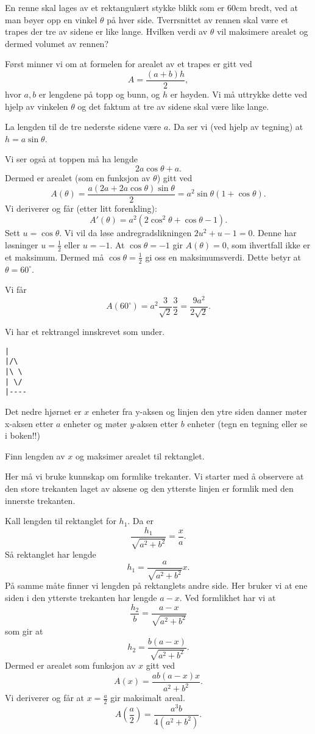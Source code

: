 \documentclass[11pt, norsk]{article}
\begin{document}
\begin{oppg}[7.7]
En renne skal lages av et rektangulært stykke blikk som er 60cm bredt, ved at man bøyer opp en vinkel $\theta$ på hver side. Tverrsnittet av rennen skal være et trapes der tre av sidene er like lange. Hvilken verdi av $\theta$ vil maksimere arealet og dermed volumet av rennen?
\end{oppg}

\begin{losn}
Først minner vi om at formelen for arealet av et trapes er gitt ved
$$
A = \frac{(a+b)h}{2},
$$
hvor $a,b$ er lengdene på topp og bunn, og $h$ er høyden. Vi må uttrykke dette ved hjelp av vinkelen $\theta$ og det faktum at tre av sidene skal være like lange.

La lengden til de tre nederste sidene være $a$. Da ser vi (ved hjelp av tegning) at $h=a \sin \theta$. 

Vi ser også at toppen må ha lengde
$$
2a\cos \theta + a.
$$
Dermed er arealet (som en funksjon av $\theta$) gitt ved
$$
A(\theta) = \frac{a(2a+2 a\cos \theta)\sin \theta}{2}=a^2 \sin \theta(1+\cos \theta).
$$
Vi deriverer og får (etter litt forenkling):
$$
A'(\theta) = a^2(2 \cos^2 \theta + \cos \theta -1).
$$
Sett $u=\cos \theta$. Vi vil da løse andregradslikningen $2u^2+u-1=0$. Denne har løsninger $u=\frac 12$ eller $u=-1$. At $\cos \theta = -1$ gir $A(\theta)=0$, som ihvertfall ikke er et maksimum. Dermed må $\cos \theta= \frac 12$ gi oss en maksimumsverdi. Dette betyr at $\theta= 60^\circ$.

Vi får
$$
A(60 ^\circ) = a^2 \frac{3}{\sqrt{2}}\frac{3}{2} = \frac{9a^2}{2\sqrt{2}}.
$$
\end{losn}

\begin{oppg}[7.1.8]
Vi har et rektrangel innskrevet som under.
\begin{verbatim}
|
|/\
|\ \
| \/
|----
\end{verbatim}
Det nedre hjørnet er $x$ enheter fra y-aksen og linjen den ytre siden danner møter x-aksen etter $a$ enheter og møter $y$-aksen etter $b$ enheter (tegn en tegning eller se i boken!!)

Finn lengden av $x$ og maksimer arealet til rektanglet.
\end{oppg}
\begin{losn}
Her må vi bruke kunnskap om formlike trekanter. Vi starter med å observere at den store trekanten laget av aksene og den ytterste linjen er formlik med den innerste trekanten.

Kall lengden til rektanglet for $h_1$. Da er
$$
\frac{h_1}{\sqrt{a^2+b^2}} = \frac{x}{a}.
$$
Så rektanglet har lengde
$$
h_1 = \frac{a}{\sqrt{a^2+b^2}}x.
$$
På samme måte finner vi lengden på rektanglets andre side. Her bruker vi at ene siden i den ytterste trekanten har lengde $a-x$. Ved formlikhet har vi at 
$$
\frac{h_2}{b} = \frac{a-x}{\sqrt{a^2+b^2}}
$$
som gir at
$$
h_2 = \frac{b(a-x)}{\sqrt{a^2+b^2}}.
$$
Dermed er arealet som funksjon av $x$ gitt ved
$$
A(x) = \frac{ab(a-x)x}{a^2+b^2}.
$$
Vi deriverer og får at $x=\frac a2$ gir maksimalt areal.
$$
A\left(\frac a2 \right) = \frac{a^3b}{4(a^2+b^2)}.
$$
\end{losn}
\end{document}
